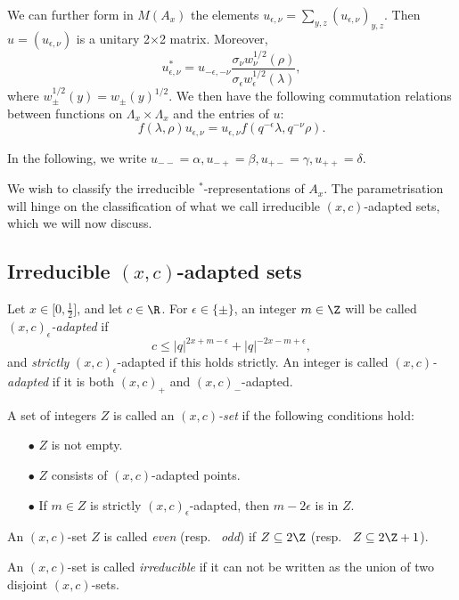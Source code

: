 We can further form in $M(A_x)$ the elements $u_{\epsilon,\nu} = \sum_{y,z} (u_{\epsilon,\nu})_{y,z}$. Then $u=(u_{\epsilon,\nu})$ is a unitary 2$\times$2 matrix. Moreover, \begin{equation}\label{EqAdju}u_{\epsilon,\nu}^* = u_{-\epsilon,-\nu}\frac{ \sigma_{\nu}w_{\nu}^{1/2}(\rho)}{\sigma_{\epsilon}w_{\epsilon}^{1/2}(\lambda)} ,\end{equation} where $w_{\pm}^{1/2}(y) = w_{\pm}(y)^{1/2}$.  We then have the following commutation relations between functions on $\Lambda_x\times \Lambda_x$ and the entries of $u$: \begin{equation}\label{EqGradu} f(\lambda,\rho)u_{\epsilon,\nu} = u_{\epsilon,\nu}f(q^{-\epsilon}\lambda,q^{-\nu}\rho).\end{equation}

In the following, we write $u_{--}=\alpha, u_{-+}= \beta, u_{+-}=\gamma,u_{++}=\delta$. 

We wish to classify the irreducible $^*$-representations of $A_x$. The parametrisation will hinge on the classification of what we call irreducible $(x,c)$-adapted sets, which we will now discuss.

\subsection{Irreducible $(x,c)$-adapted sets}

\begin{Def}\label{DefAdapt} Let $x\in \lbrack 0,\frac{1}{2}\rbrack$, and let $c\in\R$. For $\epsilon \in \{\pm\}$, an integer $m\in \Z$ will be called \emph{$(x,c)_{\epsilon}$-adapted} if \begin{equation}\label{EqAd+}c \leq |q|^{2x+m-\epsilon}+|q|^{-2x-m+\epsilon},\end{equation} and \emph{strictly} $(x,c)_{\epsilon}$-adapted if this holds strictly. An integer is called \emph{$(x,c)$-adapted} if it is both $(x,c)_+$ and $(x,c)_-$-adapted. 

A set of integers $Z$ is called an  \emph{$(x,c)$-set} if the following conditions hold: \begin{itemize} 
\item[$\bullet$] $Z$ is not empty.
\item[$\bullet$] $Z$ consists of $(x,c)$-adapted points.
\item[$\bullet$] If $m\in Z$ is strictly $(x,c)_{\epsilon}$-adapted, then $m-2\epsilon$ is in $Z$.
\end{itemize}
An $(x,c)$-set $Z$ is called \emph{even} (resp.~ \emph{odd}) if $Z\subseteq 2\Z$ (resp.~ $Z\subseteq 2\Z+1$).

An $(x,c)$-set is called \emph{irreducible} if it can not be written as the union of two disjoint $(x,c)$-sets.
\end{Def}


